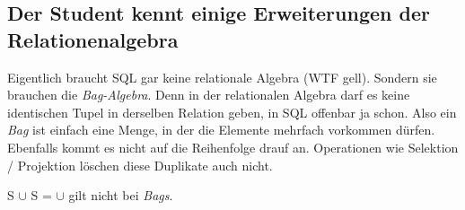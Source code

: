 \subsection{Der Student kennt einige Erweiterungen der Relationenalgebra}
Eigentlich braucht SQL gar keine relationale Algebra (WTF gell). Sondern sie brauchen die \emph{Bag-Algebra}. Denn in der relationalen Algebra darf es keine identischen Tupel in derselben Relation geben, in SQL offenbar ja schon. Also ein \emph{Bag} ist einfach eine Menge, in der die Elemente mehrfach vorkommen dürfen. Ebenfalls kommt es nicht auf die Reihenfolge drauf an. Operationen wie Selektion / Projektion löschen diese Duplikate auch nicht.

S \(\cup\) S = \(\cup\) gilt nicht bei \emph{Bags}.